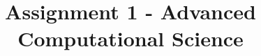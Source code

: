 \documentclass[10pt]{article}
\title{Assignment 1 - Advanced Computational Science}
\begin{document}
\maketitle

\section{}
\section{}
\section{}
\end{document}
